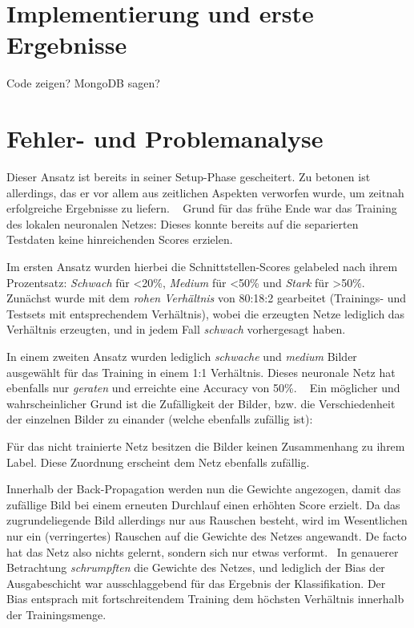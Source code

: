 \section{Implementierung und erste Ergebnisse}
Code zeigen? MongoDB sagen? 
\newpage
\section{Fehler- und Problemanalyse}
Dieser Ansatz ist bereits in seiner Setup-Phase gescheitert. Zu betonen ist allerdings, das er vor allem aus zeitlichen Aspekten verworfen wurde, um zeitnah erfolgreiche Ergebnisse zu liefern.
~\newline
Grund für das frühe Ende war das Training des lokalen neuronalen Netzes: Dieses konnte bereits auf die separierten Testdaten keine hinreichenden Scores erzielen. 

Im ersten Ansatz wurden hierbei die Schnittstellen-Scores gelabeled nach ihrem Prozentsatz: \textit{Schwach} für <20\%, \textit{Medium} für <50\% und \textit{Stark} für >50\%. Zunächst wurde mit dem \textit{rohen Verhältnis} von 80:18:2 gearbeitet (Trainings- und Testsets mit entsprechendem Verhältnis), wobei die erzeugten Netze lediglich das Verhältnis erzeugten, und in jedem Fall \textit{schwach} vorhergesagt haben. 

In einem zweiten Ansatz wurden lediglich \textit{schwache} und \textit{medium} Bilder ausgewählt für das Training in einem 1:1 Verhältnis. Dieses neuronale Netz hat ebenfalls nur \textit{geraten} und erreichte eine Accuracy von 50\%.    
~\newline
Ein möglicher und wahrscheinlicher Grund ist die Zufälligkeit der Bilder, bzw. die Verschiedenheit der einzelnen Bilder zu einander (welche ebenfalls zufällig ist):

Für das nicht trainierte Netz besitzen die Bilder keinen Zusammenhang zu ihrem Label. Diese Zuordnung erscheint dem Netz ebenfalls zufällig. 

Innerhalb der Back-Propagation \cite{zhou_understanding_2018} werden nun die Gewichte angezogen, damit das zufällige Bild bei einem erneuten Durchlauf einen erhöhten Score erzielt. Da das zugrundeliegende Bild allerdings nur aus Rauschen besteht, wird im Wesentlichen nur ein (verringertes) Rauschen auf die Gewichte des Netzes angewandt. De facto hat das Netz also nichts gelernt, sondern sich nur etwas verformt. 
~\newline In genauerer Betrachtung \textit{schrumpften} die Gewichte des Netzes, und lediglich der Bias der Ausgabeschicht war ausschlaggebend für das Ergebnis der Klassifikation. Der Bias entsprach mit fortschreitendem Training dem höchsten Verhältnis innerhalb der Trainingsmenge.

